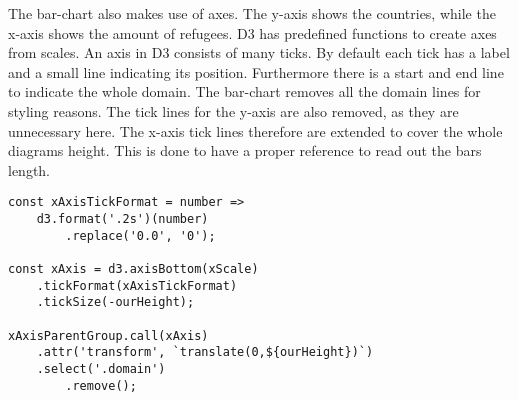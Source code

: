 The bar-chart also makes use of axes. The y-axis shows the countries, while the x-axis shows the amount of refugees. D3 has predefined functions to create axes from scales. An axis in D3 consists of many ticks. By default each tick has a label and a small line indicating its position. Furthermore there is a start and end line to indicate the whole domain. The bar-chart removes all the domain lines for styling reasons. The tick lines for the y-axis are also removed, as they are unnecessary here. The x-axis tick lines therefore are extended to cover the whole diagrams height. This is done to have a proper reference to read out the bars length.

\begin{minipage}{0.9\linewidth}
    \begin{lstlisting}[style=htmlcssjs, captionpos=b, caption={The x axis implementation of the bar chart. The first constant defines the tick format. For each number there should be two significant digits. As the zero value is represented as "0.0" to match the previous rule of two significant digits, it is simply replaced by "0". The second constant defines the function creating the axis. The previous tick format is passed here. Furthermore the \texttt{tickSize} is set to the hight of the diagram. This way the initially small tick lines now cover the whole height of the diagram and allow for easier and more accurate readouts. Finally the \texttt{xAxisParentGroup} element, which is part of ther permantent hierarchical structure of the bar-chart, calls the \texttt{xAxis} function. This adds the Axis to the diagram. As a last step the domain lines are selected and removed for styling reasons. (Section from \ref{app:bar-chart} lines 60ff)}, label={lst:bar-chart-axes}]
const xAxisTickFormat = number =>
    d3.format('.2s')(number)
        .replace('0.0', '0');

const xAxis = d3.axisBottom(xScale)
    .tickFormat(xAxisTickFormat)
    .tickSize(-ourHeight);

xAxisParentGroup.call(xAxis)
    .attr('transform', `translate(0,${ourHeight})`)
    .select('.domain')
        .remove();
    \end{lstlisting}
\end{minipage}


